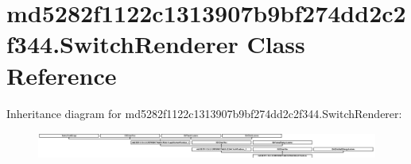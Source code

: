 \hypertarget{classmd5282f1122c1313907b9bf274dd2c2f344_1_1SwitchRenderer}{}\section{md5282f1122c1313907b9bf274dd2c2f344.\+Switch\+Renderer Class Reference}
\label{classmd5282f1122c1313907b9bf274dd2c2f344_1_1SwitchRenderer}
Inheritance diagram for md5282f1122c1313907b9bf274dd2c2f344.\+Switch\+Renderer\+:\begin{figure}[H]
\begin{center}
\leavevmode
\includegraphics[height=0.915033cm]{classmd5282f1122c1313907b9bf274dd2c2f344_1_1SwitchRenderer}
\end{center}
\end{figure}
